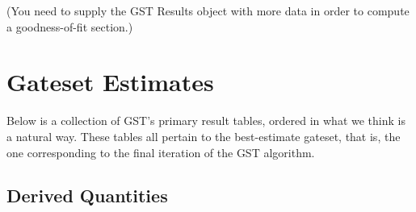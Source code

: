 \documentclass{article}[11pt]
\begin{document}
{%

}{ (You need to supply the GST Results object with more data in order to compute a goodness-of-fit section.) }

\FloatBarrier

\section{Gateset Estimates}
Below is a collection of GST's primary result tables, ordered in what we think is a natural way.  These tables all pertain to the best-estimate gateset, that is, the one corresponding to the final iteration of the GST algorithm.

\subsection{Derived Quantities}
\end{document}
